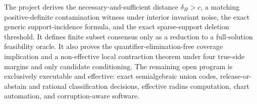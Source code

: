 The project derives the necessary-and-sufficient distance \(\delta_H>c\), a matching positive-definite contamination witness under interior invariant noise, the exact generic support-incidence formula, and the exact sparse-support deletion threshold. It defines finite subset consensus only as a reduction to a full-solution feasibility oracle. It also proves the quantifier-elimination-free coverage implication and a non-effective local contraction theorem under four true-side margins and only candidate conditioning. The remaining open program is exclusively executable and effective: exact semialgebraic union codes, release-or-abstain and rational classification decisions, effective radius computation, chart automation, and corruption-aware software.
